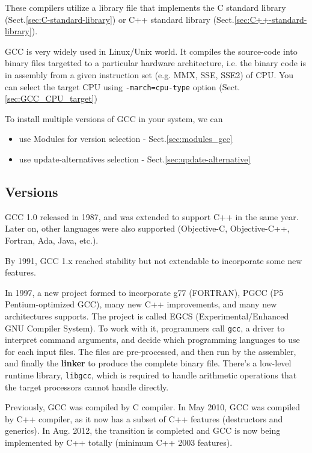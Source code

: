These compilers utilize a library file that implements the C standard library
(Sect.\ref{sec:C-standard-library}) or C++ standard library
(Sect.\ref{sec:C++-standard-library}).

GCC is very widely used in Linux/Unix world. It compiles the source-code into
binary files targetted to a particular hardware architecture, i.e. the binary
code is in assembly from a given instruction set (e.g. MMX, SSE, SSE2) of CPU.
You can select the target CPU using \verb!-march=cpu-type! option
(Sect.\ref{sec:GCC_CPU_target})

To install multiple versions of GCC in your system, we
can 
\begin{itemize}
  \item use Modules for version selection - Sect.\ref{sec:modules_gcc}
  \item use update-alternatives selection - Sect.\ref{sec:update-alternative}
\end{itemize}

\subsection{Versions}

GCC 1.0 released in 1987, and was extended to support C++ in the same year.
Later on, other languages were also supported (Objective-C, Objective-C++, Fortran, Ada,
Java, etc.).

By 1991, GCC 1.x reached stability but not extendable to incorporate some new
features. 

In 1997, a new project formed to incorporate g77 (FORTRAN), PGCC (P5
Pentium-optimized GCC), many new C++ improvements, and many new architectures
supports. The project is called EGCS (Experimental/Enhanced GNU Compiler
System). To work with it, programmers call \verb!gcc!, a driver to interpret
command arguments, and decide which programming languages to use for each input
files. The files are pre-processed, and then run by the assembler, and finally
the {\bf linker} to produce the complete binary file. There's a low-level
runtime library, \verb!libgcc!, which is required to handle arithmetic
operations that the target processors cannot handle directly.

\begin{mdframed}
Previously, GCC was compiled by C compiler. In May 2010, GCC was compiled by C++
compiler, as it now has a subset of C++ features (destructors and generics). In
Aug. 2012, the transition is completed and GCC is now being implemented by C++
totally (minimum C++ 2003 features).
\end{mdframed}

